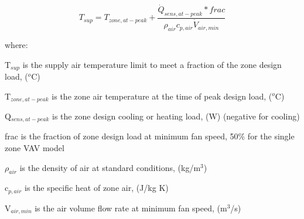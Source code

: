 \begin{equation}
T_{sup} = T_{zone,at-peak}+\frac{\dot{Q}_{sens,at-peak} * frac}{\rho_{air}c_{p,air}\dot{V}_{air,min}}
\end{equation}

where:

T\(_{sup}\) is the supply air temperature limit to meet a fraction of the zone design load, (\(^{o}\)C)

T\(_{zone,at-peak}\) is the zone air temperature at the time of peak design load, (\(^{o}\)C)

Q\(_{sens,at-peak}\) is the zone design cooling or heating load, (W) (negative for cooling)

frac is the fraction of zone design load at minimum fan speed, 50\% for the single zone VAV model

\(\rho_{air}\) is the density of air at standard conditions, (kg/m\(^{3}\))

c\(_{p,air}\) is the specific heat of zone air, (J/kg K)

V\(_{air,min}\) is the air volume flow rate at minimum fan speed, (m\(^{3}\)/s)
